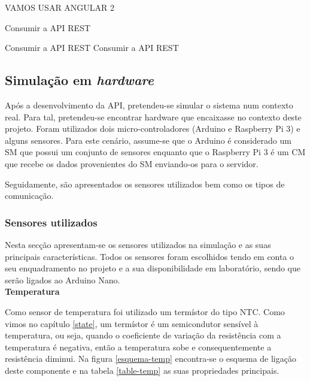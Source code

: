 VAMOS USAR ANGULAR 2




Consumir a API REST 

Consumir a API REST 
Consumir a API REST 


\subsection{Simulação em \textit{hardware}}


Após a desenvolvimento da API, pretendeu-se simular o sistema num contexto real. Para tal, pretendeu-se encontrar hardware que encaixasse no contexto deste projeto. Foram utilizados dois micro-controladores (Arduino e Raspberry Pi 3) e alguns sensores. Para este cenário, assume-se que o Arduino é considerado um \acl{SM} que possui um conjunto de sensores enquanto que o Raspberry Pi 3 é um \acl{CM} que recebe os dados provenientes do \acl{SM} enviando-os para o servidor.  

Seguidamente, são apresentados os sensores utilizados bem como os tipos de comunicação. 
 
\newpage
\subsubsection{Sensores utilizados}

Nesta secção apresentam-se os sensores utilizados na simulação e as suas principais características. Todos os sensores foram escolhidos tendo em conta o seu enquadramento no projeto e a sua disponibilidade em laboratório, sendo que serão ligados ao Arduino Nano. \\


\textbf{Temperatura}


Como sensor de temperatura foi utilizado um termístor do tipo \ac{NTC}. Como vimos no capítulo \ref{state}, um termístor é um semicondutor sensível à temperatura, ou seja, quando o coeficiente de variação da resistência com a temperatura é negativa, então a temperatura sobe e consequentemente a resistência diminui. Na figura \ref{esquema-temp} encontra-se o esquema de ligação deste componente e na tabela \ref{table-temp} as suas propriedades principais. 


